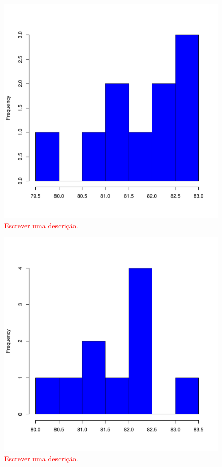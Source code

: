 \documentclass[conference]{IEEEtran}
\begin{document}
\begin{figure}[h]
	\centering
	\includegraphics[width=\linewidth]{img/bluehist_afsa_mfd.pdf}
	\caption{\textcolor{red}{Escrever uma descrição}.}
	\label{fig:hist_afsa_mfd}
\end{figure}

\begin{figure}[h]
	\centering
	\includegraphics[width=\linewidth]{img/bluehist_mfd.pdf}
	\caption{\textcolor{red}{Escrever uma descrição}.}
	\label{fig:hist_mfd}
\end{figure}
\end{document}
